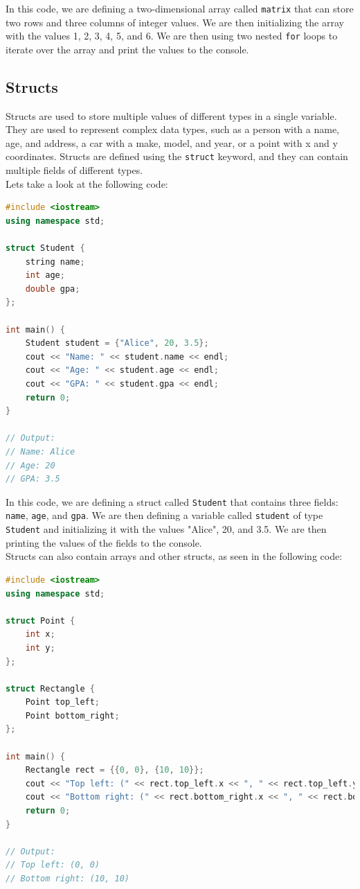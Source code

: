 In this code, we are defining a two-dimensional array called \texttt{matrix} that can store two rows and three columns of integer
values. We are then initializing the array with the values 1, 2, 3, 4, 5, and 6. We are then using two nested \texttt{for} loops
to iterate over the array and print the values to the console.\\

\subsection{Structs}

Structs are used to store multiple values of different types in a single variable. They are used to represent complex data types,
such as a person with a name, age, and address, a car with a make, model, and year, or a point with x and y coordinates. Structs
are defined using the \texttt{struct} keyword, and they can contain multiple fields of different types.\\

Lets take a look at the following code:

\begin{lstlisting}[language=C++]
#include <iostream>
using namespace std;

struct Student {
    string name;
    int age;
    double gpa;
};

int main() {
    Student student = {"Alice", 20, 3.5};
    cout << "Name: " << student.name << endl;
    cout << "Age: " << student.age << endl;
    cout << "GPA: " << student.gpa << endl;
    return 0;
}

// Output:
// Name: Alice
// Age: 20
// GPA: 3.5
\end{lstlisting}

In this code, we are defining a struct called \texttt{Student} that contains three fields: \texttt{name}, \texttt{age}, and
\texttt{gpa}. We are then defining a variable called \texttt{student} of type \texttt{Student} and initializing it with the
values "Alice", 20, and 3.5. We are then printing the values of the fields to the console.\\

Structs can also contain arrays and other structs, as seen in the following code:

\begin{lstlisting}[language=C++]
#include <iostream>
using namespace std;

struct Point {
    int x;
    int y;
};

struct Rectangle {
    Point top_left;
    Point bottom_right;
};

int main() {
    Rectangle rect = {{0, 0}, {10, 10}};
    cout << "Top left: (" << rect.top_left.x << ", " << rect.top_left.y << ")" << endl;
    cout << "Bottom right: (" << rect.bottom_right.x << ", " << rect.bottom_right.y << ")" << endl;
    return 0;
}

// Output:
// Top left: (0, 0)
// Bottom right: (10, 10)
\end{lstlisting}

